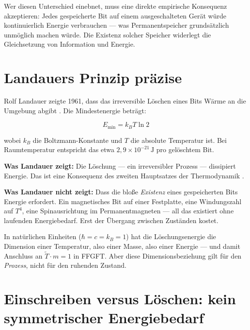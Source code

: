 Wer diesen Unterschied einebnet, muss eine direkte empirische Konsequenz
akzeptieren: Jedes gespeicherte Bit auf einem ausgeschalteten Gerät würde
kontinuierlich Energie verbrauchen — was Permanentspeicher grundsätzlich
unmöglich machen würde. Die Existenz solcher Speicher widerlegt die
Gleichsetzung von Information und Energie.

\section{Landauers Prinzip präzise}

Rolf Landauer zeigte 1961, dass das irreversible Löschen eines Bits
Wärme an die Umgebung abgibt \cite{Landauer1961}. Die Mindestenergie beträgt:

\begin{equation}
  E_{\min} = k_B T \ln 2
\end{equation}

wobei $k_B$ die Boltzmann-Konstante und $T$ die absolute Temperatur ist.
Bei Raumtemperatur entspricht das etwa $2{,}9 \times 10^{-21}\,\text{J}$
pro gelöschtem Bit.

\textbf{Was Landauer zeigt:} Die Löschung — ein irreversibler Prozess —
dissipiert Energie. Das ist eine Konsequenz des zweiten Hauptsatzes der
Thermodynamik \cite{Bennett1982}.

\textbf{Was Landauer nicht zeigt:} Dass die bloße \emph{Existenz} eines
gespeicherten Bits Energie erfordert. Ein magnetisches Bit auf einer
Festplatte, eine Windungszahl auf $T^4$, eine Spinausrichtung im Permanentmagneten
— all das existiert ohne laufenden Energiebedarf. Erst der Übergang zwischen
Zuständen kostet.

In natürlichen Einheiten ($\hbar = c = k_B = 1$) hat die Löschungsenergie
die Dimension einer Temperatur, also einer Masse, also einer Energie — und
damit Anschluss an $\tilde{T} \cdot m = 1$ in FFGFT. Aber diese
Dimensionsbeziehung gilt für den \emph{Prozess}, nicht für den ruhenden
Zustand.

\section{Einschreiben versus Löschen: kein symmetrischer Energiebedarf}

